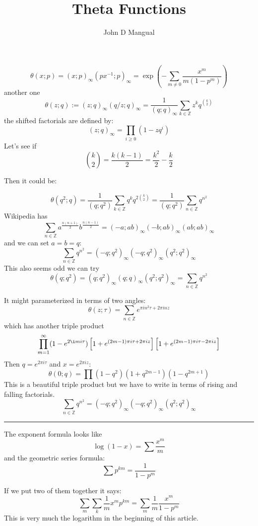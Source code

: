 \documentclass[12pt]{article}
\title{\textbf{ Theta Functions }}
\author{John D Mangual}
\date{}
\begin{document}
\selectfont \fontsize{25}{30}\selectfont

\maketitle

$$\theta(x; p) = (x;p)_\infty (px^{-1}; p)_\infty = \exp \left( - \sum_{ m \neq 0} \frac{x^m}{m(1-p^m)} \right) $$
another one
$$\theta(z; q) := (z;q)_\infty (q/z ;q)_\infty = \frac{1}{(q;q)_\infty} \sum_{k \in \mathbb{Z}} z^k q^{\binom{k}{2}}  $$
the shifted factorials are defined by:
$$ (z;q)_\infty = \prod_{i \geq 0} (1 - z q^i)$$
Let's see if
$$ \binom{k}{2} = \frac{k(k-1)}{2} = \frac{k^2}{2} - \frac{k}{2}$$

\newpage

\noindent Then it could be:

$$ \theta( q^2 ; q) = \frac{1}{(q; q^2) }
\sum_{k \in \mathbb{Z}} q^k q^{2\binom{k}{2}}
 = \frac{1}{(q; q^2) }
\sum_{n \in \mathbb{Z}}  q^{n^2}
$$
Wikipedia has
$$ \sum_{n \in \mathbb{Z}}
a^{\frac{n(n+1)}{2}}
b^{\frac{n(n-1)}{2}}
= (-a; ab)_\infty (-b; ab)_\infty (ab; ab)_\infty
$$
and we can set $a = b = q$:
$$
\sum_{n \in \mathbb{Z}}
q^{n^2}
= (-q; q^2)_\infty (-q; q^2)_\infty (q^2; q^2)_\infty
 $$
 This also seems odd we can try
$$ \theta(q;q^2)
= (q;q^2)_\infty (q;q)_\infty (q^2; q^2)_\infty = \sum_{n \in \mathbb{Z}}q^{n^2}$$

\newpage 

\noindent It might parameterized in terms of two angles:
$$ \theta(z; \tau) = \sum_{n \in \mathbb{Z}} e^{\pi i n^2 \tau + 2\pi i n z}$$
which has another triple product
$$\prod_{m=1}^\infty
(1 - e^{2\i m i \tau})
\left[ 1 + e^{(2m-1)\pi i \tau + 2\pi i z} \right]
\left[ 1 + e^{(2m-1)\pi i \tau - 2\pi i z} \right]$$
Then $q = e^{2\pi i \tau}$ and $x = e^{2\pi i z}$:
$$\theta( 0; q) =  \prod (1 - q^2 )(1 + q^{2m-1})(1 - q^{2m+1}) $$
This is a beautiful triple product but we have to write in terms of rising and falling factorials.
$$
\sum_{n \in \mathbb{Z}}
q^{n^2}
= (-q; q^2)_\infty (-q; q^2)_\infty (q^2; q^2)_\infty
 $$
 \hrule
\vspace{12pt}
\noindent The exponent formula looks like
$$ \log(1-x) = \sum \frac{x^m}{m} $$
and the geometric series formula:
$$ \sum p^{km} = \frac{1}{1-p^m}$$
\newpage

\noindent If we put two of them together it says:
$$ \sum_m \sum_k \frac{1}{m}x^m p^{km} = \sum_m \frac{1}{m} \frac{x^m }{1 - p^m} $$
This is very much the logarithm in the beginning of this article.
 \newpage
\end{document}

